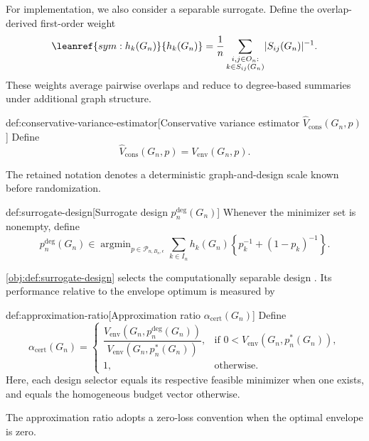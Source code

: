 \documentclass[11pt]{article}
\begin{document}
For implementation, we also consider a separable surrogate. Define the overlap-derived first-order weight
\[
\leanref{sym:h_k(G_n)}{\ensuremath{h_k(G_n)}}
=
\frac{1}{n}\sum_{\substack{i,j\in O_n:\\ k\in S_{ij}(G_n)}}
\lvert S_{ij}(G_n)\rvert^{-1}.
\]
These weights average pairwise overlaps and reduce to degree-based summaries under additional graph structure.

\begin{definitionv}{def:conservative-variance-estimator}[Conservative variance estimator $\widehat V_{\mathrm{cons}}(G_n,p)$]
Define
\[
\widehat V_{\mathrm{cons}}(G_n,p)
=
V_{\mathrm{env}}(G_n,p).
\]
\end{definitionv}

The retained notation  denotes a deterministic graph-and-design scale known before randomization.

\begin{definitionv}{def:surrogate-design}[Surrogate design $p_n^{\deg}(G_n)$]
Whenever the minimizer set is nonempty, define
\[
p_n^{\deg}(G_n)\in
\operatorname{argmin}_{p\in\mathcal P_{n,B_n,\epsilon}}
\sum_{k\in I_n} h_k(G_n)
\left\{p_k^{-1}+(1-p_k)^{-1}\right\}.
\]
\end{definitionv}

\cref{obj:def:surrogate-design} selects the computationally separable design . Its performance relative to the envelope optimum is measured by

\begin{definitionv}{def:approximation-ratio}[Approximation ratio $\alpha_{\mathrm{cert}}(G_n)$]
Define
\[
\alpha_{\mathrm{cert}}(G_n)=
\begin{cases}
\dfrac{V_{\mathrm{env}}\!\left(G_n,p_n^{\deg}(G_n)\right)}
{V_{\mathrm{env}}\!\left(G_n,p_n^*(G_n)\right)},
& \text{if }0<V_{\mathrm{env}}\!\left(G_n,p_n^*(G_n)\right),\\
1,
& \text{otherwise}.
\end{cases}
\]
Here, each design selector equals its respective feasible minimizer when one exists, and equals the homogeneous budget vector otherwise.
\end{definitionv}

The approximation ratio  adopts a zero-loss convention when the optimal envelope is zero.
\end{document}
